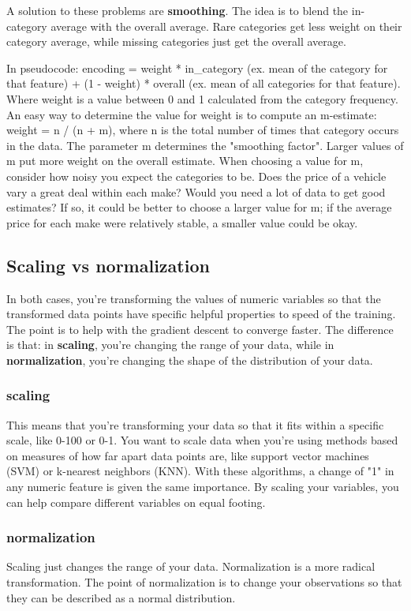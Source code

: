 \documentclass[12pt]{report}
\begin{document}
A solution to these problems are \textbf{smoothing}. The idea is to blend the in-category average with the overall average. Rare categories get less weight on their category average, while missing categories just get the overall average.

In pseudocode: encoding = weight * in\_category (ex. mean of the category for that feature) + (1 - weight) * overall (ex. mean of all categories for that feature). Where weight is a value between 0 and 1 calculated from the category frequency. An easy way to determine the value for weight is to compute an m-estimate: weight = n / (n + m), where n is the total number of times that category occurs in the data. The parameter m determines the "smoothing factor". Larger values of m put more weight on the overall estimate. When choosing a value for m, consider how noisy you expect the categories to be. Does the price of a vehicle vary a great deal within each make? Would you need a lot of data to get good estimates? If so, it could be better to choose a larger value for m; if the average price for each make were relatively stable, a smaller value could be okay.

\subsection{Scaling vs normalization}

In both cases, you're transforming the values of numeric variables so that the transformed data points have specific helpful properties to speed of the training. The point is to help with the gradient descent to converge faster. The difference is that: in \textbf{scaling}, you're changing the range of your data, while in \textbf{normalization}, you're changing the shape of the distribution of your data.

\subsubsection{scaling}
This means that you're transforming your data so that it fits within a specific scale, like 0-100 or 0-1. You want to scale data when you're using methods based on measures of how far apart data points are, like support vector machines (SVM) or k-nearest neighbors (KNN). With these algorithms, a change of "1" in any numeric feature is given the same importance. By scaling your variables, you can help compare different variables on equal footing.

\subsubsection{normalization}
Scaling just changes the range of your data. Normalization is a more radical transformation. The point of normalization is to change your observations so that they can be described as a normal distribution.
\end{document}
